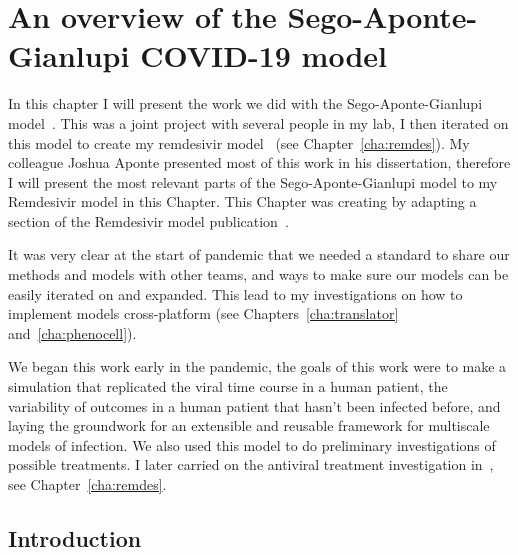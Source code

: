\chapter{An overview of the Sego-Aponte-Gianlupi COVID-19 model}\label{cha:sego-aponte}

In this chapter I will present the work we did with the Sego-Aponte-Gianlupi model~\cite{sego_modular_2020}. This was a joint project with several people in my lab, I then iterated on this model to create my remdesivir model~\cite{ferrari_gianlupi_multiscale_2022} (see Chapter~\ref{cha:remdes}). My colleague Joshua Aponte presented most of this work in his dissertation, therefore I will present the most relevant parts of the Sego-Aponte-Gianlupi model to my Remdesivir model in this Chapter. This Chapter was creating by adapting a section of the Remdesivir model publication~\cite{ferrari_gianlupi_multiscale_2022}.

It was very clear at the start of pandemic that we needed a standard to share our methods and models with other teams, and ways to make sure our models can be easily iterated on and expanded. This lead to my investigations on how to implement models cross-platform (see Chapters~\ref{cha:translator} and~\ref{cha:phenocell}).

We began this work early in the pandemic, the goals of this work were to make a simulation that replicated the viral time course in a human patient, the variability of outcomes in a human patient that hasn't been infected before, and laying the groundwork for an extensible and reusable framework for multiscale models of infection. We also used this model to do preliminary investigations of possible treatments. I later carried on the antiviral treatment investigation in~\cite{ferrari_gianlupi_multiscale_2022}, see Chapter~\ref{cha:remdes}.

\section{Introduction}\label{sec:sego-aponte:intro}

